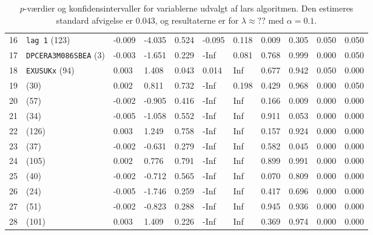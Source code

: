 \begin{table}[h]
{\begin{tabular}{lllllllllll}
16 & \texttt{lag 1} (123) & -0.009 & -4.035  & 0.524  &  -0.095 &   0.118 &  0.009 &  0.305  &     0.050 &     0.050 \\
17 & \texttt{DPCERA3M086SBEA} (3) & -0.003 & -1.651  & 0.229  &    -Inf &   0.081 &  0.768 &  0.999  &     0.000  & 0.050 \\
18 & \texttt{EXUSUKx} (94) & 0.003 &  1.408 &  0.043  &   0.014 &     Inf &  0.677 &  0.942  &     0.050 &     0.000 \\
19 & (30) & 0.002  & 0.811  & 0.732  &    -Inf  &  0.198  & 0.429  & 0.968   &    0.000 &     0.050 \\
20 & (57) & -0.002 & -0.905 &  0.416 &     -Inf  &    Inf &  0.166  & 0.009  &     0.000  &    0.000 \\
21 & (34) & -0.005 & -1.058 &  0.552 &     -Inf    &  Inf &  0.911 &  0.053  &     0.000   &   0.000 \\
22 & (126) &  0.003  & 1.249  & 0.758  &    -Inf   &   Inf &  0.157 &  0.924  &     0.000  &    0.000 \\
23 & (37) & -0.002 & -0.631 &  0.279  &    -Inf  &    Inf &  0.582 &  0.045 &      0.000 &     0.000 \\
24 & (105) & 0.002  & 0.776  & 0.791   &   -Inf  &    Inf &  0.899  & 0.991   &    0.000  &    0.000\\
25 & (40) &-0.002 & -0.712 &  0.565 &     -Inf &     Inf  & 0.070 &  0.809   &    0.000   &   0.000 \\
26 & (24) & -0.005 & -1.746 &  0.259  &    -Inf &     Inf &  0.417  & 0.696   &    0.000 &     0.000 \\
27 & (51) & -0.002 & -0.823 &  0.288  &    -Inf  &    Inf &  0.945  & 0.936  &     0.000     & 0.000 \\
28 & (101) & 0.003 & 1.409 & 0.226  & -Inf & Inf & 0.369 & 0.974  & 0.000  &    0.000 \\
\bottomrule
\end{tabular}  
}
\caption{\(p\)-værdier og konfidensintervaller for variablerne udvalgt af lars algoritmen. Den estimeres standard afvigelse er \(0.043\), og resultaterne er for \(\lambda \approx ??\) med \(\alpha = 0.1\).} \label{tab:larInf}
\end{table} 